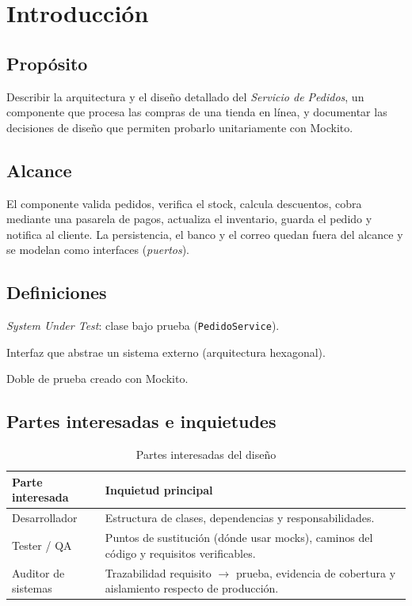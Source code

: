 \documentclass[11pt,a4paper,oneside]{report}
\newcommand{\code}[1]{\texttt{#1}}
\begin{document}
\section{Introducción}
\subsection{Propósito}
Describir la arquitectura y el diseño detallado del \emph{Servicio de Pedidos}, un componente que procesa las compras de una tienda en línea, y documentar las decisiones de diseño que permiten probarlo unitariamente con Mockito.

\subsection{Alcance}
El componente valida pedidos, verifica el stock, calcula descuentos, cobra mediante una pasarela de pagos, actualiza el inventario, guarda el pedido y notifica al cliente. La persistencia, el banco y el correo quedan fuera del alcance y se modelan como interfaces (\emph{puertos}).

\subsection{Definiciones}
\begin{description}[itemsep=0pt]
  \item[SUT] \emph{System Under Test}: clase bajo prueba (\code{PedidoService}).
  \item[Puerto] Interfaz que abstrae un sistema externo (arquitectura hexagonal).
  \item[Mock] Doble de prueba creado con Mockito.
\end{description}

\subsection{Partes interesadas e inquietudes}
\begin{table}[H]
\centering
\caption{Partes interesadas del diseño}
\begin{tabularx}{\linewidth}{lX}
\toprule
\textbf{Parte interesada} & \textbf{Inquietud principal}\\
\midrule
Desarrollador & Estructura de clases, dependencias y responsabilidades.\\
Tester / QA & Puntos de sustitución (dónde usar mocks), caminos del código y requisitos verificables.\\
Auditor de sistemas & Trazabilidad requisito $\rightarrow$ prueba, evidencia de cobertura y aislamiento respecto de producción.\\
\bottomrule
\end{tabularx}
\end{table}
\end{document}
